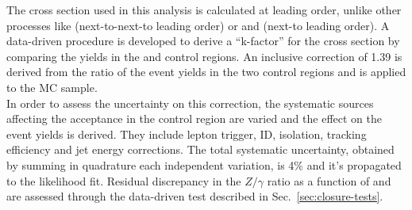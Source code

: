 The \gj cross section used in this analysis is calculated at leading
order, unlike other processes like \ttj (next-to-next-to leading
order) or \zj and \wj (next-to leading order).  A data-driven
procedure is developed to derive a ``k-factor'' for the \gj cross
section by comparing the yields in the \gj and \mmj control regions.
An inclusive correction of 1.39 is derived from the ratio of the event
yields in the two
control regions and is applied to the \gj MC sample. \\
In order to assess the uncertainty on this correction, the systematic
sources affecting the acceptance in the \mmj control region are varied
and the effect on the event yields is derived.  They include lepton
trigger, ID, isolation, tracking efficiency and jet energy
corrections.  The total systematic uncertainty, obtained by summing in
quadrature each independent variation, is 4\% and it's propagated to
the likelihood fit.  Residual discrepancy in the $Z/\gamma$ ratio as a
function of \scalht and \njet are assessed through the data-driven
test described in Sec.~\ref{sec:closure-tests}.






